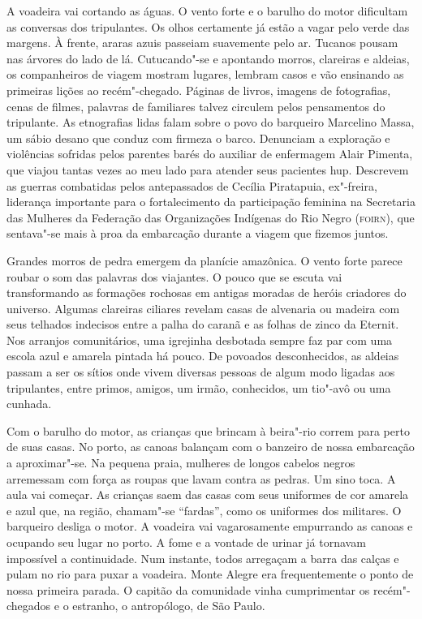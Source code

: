 A voadeira vai cortando as águas. O vento forte e o barulho do motor
dificultam as conversas dos tripulantes. Os olhos certamente já estão a
vagar pelo verde das margens. À frente, araras azuis passeiam suavemente
pelo ar. Tucanos pousam nas árvores do lado de lá. Cutucando"-se e
apontando morros, clareiras e aldeias, os companheiros de viagem mostram
lugares, lembram casos e vão ensinando as primeiras lições ao
recém"-chegado. Páginas de livros, imagens de fotografias, cenas de
filmes, palavras de familiares talvez circulem pelos pensamentos do
tripulante. As etnografias lidas falam sobre o povo do barqueiro
Marcelino Massa, um sábio desano que conduz com firmeza o barco.
Denunciam a exploração e violências sofridas pelos parentes barés do
auxiliar de enfermagem Alair Pimenta, que viajou tantas vezes ao meu
lado para atender seus pacientes hup. Descrevem as guerras combatidas
pelos antepassados de Cecília Piratapuia, ex"-freira, liderança
importante para o fortalecimento da participação feminina na Secretaria
das Mulheres da Federação das Organizações Indígenas do Rio Negro
({\textsc{foirn}}), que sentava"-se mais à proa da embarcação durante a viagem que
fizemos juntos.

Grandes morros de pedra emergem da planície amazônica. O vento forte
parece roubar o som das palavras dos viajantes. O pouco que se escuta
vai transformando as formações rochosas em antigas moradas de heróis
criadores do universo. Algumas clareiras ciliares revelam casas de
alvenaria ou madeira com seus telhados indecisos entre a palha do caranã
e as folhas de zinco da Eternit. Nos arranjos comunitários, uma
igrejinha desbotada sempre faz par com uma escola azul e amarela pintada
há pouco. De povoados desconhecidos, as aldeias passam a ser os sítios
onde vivem diversas pessoas de algum modo ligadas aos tripulantes, entre
primos, amigos, um irmão, conhecidos, um tio"-avô ou uma cunhada.

Com o barulho do motor, as crianças que brincam à beira"-rio correm para
perto de suas casas. No porto, as canoas balançam com o banzeiro de
nossa embarcação a aproximar"-se. Na pequena praia, mulheres de longos
cabelos negros arremessam com força as roupas que lavam contra as
pedras. Um sino toca. A aula vai começar. As crianças saem das casas com
seus uniformes de cor amarela e azul que, na região, chamam"-se
``fardas'', como os uniformes dos militares. O barqueiro desliga o
motor. A voadeira vai vagarosamente empurrando as canoas e ocupando seu
lugar no porto. A fome e a vontade de urinar já tornavam impossível a
continuidade. Num instante, todos arregaçam a barra das calças e pulam
no rio para puxar a voadeira. Monte Alegre era frequentemente o ponto de
nossa primeira parada. O capitão da comunidade vinha cumprimentar os
recém"-chegados e o estranho, o antropólogo, de São Paulo.


